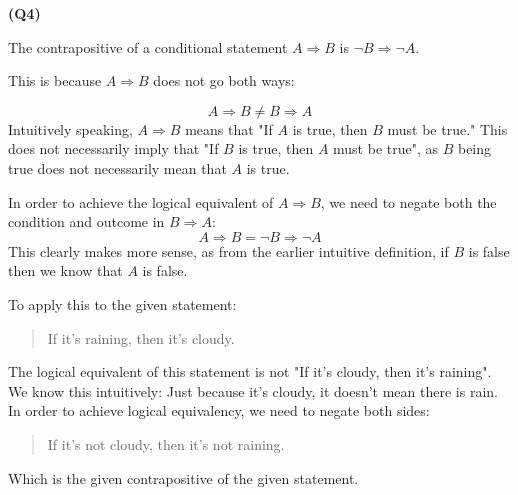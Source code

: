 \documentclass[12pt, letterpaper]{article}
\begin{document}
\textbf{(Q4)}

The contrapositive of a conditional statement $A \Rightarrow B$ is $\neg B \Rightarrow \neg A$.

This is because $A \Rightarrow B$ does not go both ways:

\[
    A \Rightarrow B \neq B \Rightarrow A
\]
Intuitively speaking, $A \Rightarrow B$ means that "If $A$ is true, then $B$ must be true." This does
not necessarily imply that "If $B$ is true, then $A$ must be true", as $B$ being true does not
necessarily mean that $A$ is true.

In order to achieve the logical equivalent of $A \Rightarrow B$, we need to negate both the
condition and outcome in $B \Rightarrow A$:
\[
    A \Rightarrow B = \neg B \Rightarrow \neg A
\]
This clearly makes more sense, as from the earlier intuitive definition, if $B$ is false then
we know that $A$ is false.

To apply this to the given statement:
\begin{quote}
    If it's raining, then it's cloudy.
\end{quote}

The logical equivalent of this statement is not "If it's cloudy, then it's raining".
We know this intuitively: Just because it's cloudy, it doesn't mean there
is rain. In order to achieve logical equivalency, we need to negate both sides:
\begin{quote}
    If it's not cloudy, then it's not raining.
\end{quote}
Which is the given contrapositive of the given statement.
\end{document}
